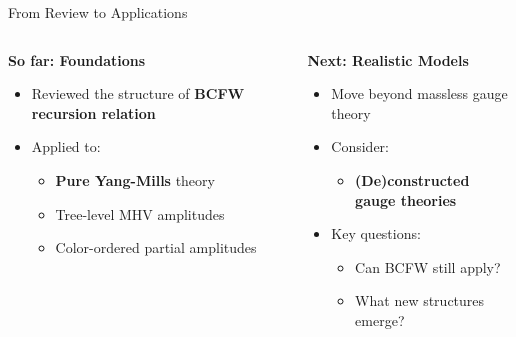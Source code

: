 \documentclass{beamer}
\begin{document}
\begin{frame}{From Review to Applications}

\begin{columns}[T]
  \begin{column}{0.48\textwidth}
    \begin{block}{\centering\large \textbf{So far: Foundations}}
      \begin{itemize}[left=1em]
        \item Reviewed the structure of \textbf{BCFW recursion relation}
        \item Applied to:
          \begin{itemize}[left=0.1em]
            \item \textbf{Pure Yang-Mills} theory
            \item Tree-level MHV amplitudes
            \item Color-ordered partial amplitudes
          \end{itemize}
      \end{itemize}
    \end{block}
  \end{column}
\pause
  \begin{column}{0.48\textwidth}
    \begin{block}{\centering\large \textbf{Next: Realistic Models}}
      \begin{itemize}[left=1em]
        \item Move beyond massless gauge theory
        \item Consider:
          \begin{itemize}[left=0.1em]
            \item \textbf{(De)constructed gauge theories}
          \end{itemize}
        \item Key questions:
          \begin{itemize}[left=0.1em]
            \item Can BCFW still apply?
            \item What new structures emerge?
          \end{itemize}
      \end{itemize}
    \end{block}
  \end{column}
\end{columns}

\end{frame}
\end{document}
